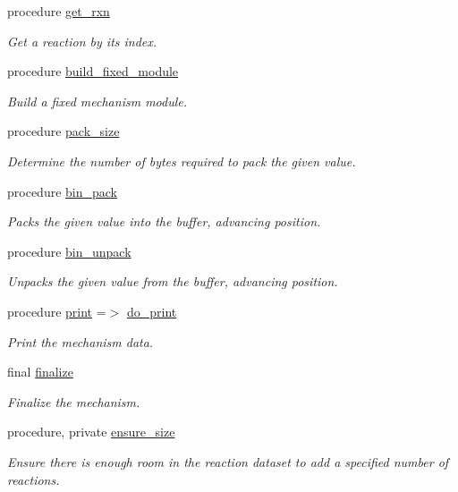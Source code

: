 \begin{DoxyCompactItemize}
procedure \mbox{\hyperlink{structpmc__mechanism__data_1_1mechanism__data__t_a3081f703c90ce4c40eba462587e8df49}{get\+\_\+rxn}}
\begin{DoxyCompactList}\small\item\em Get a reaction by its index. \end{DoxyCompactList}\item 
procedure \mbox{\hyperlink{structpmc__mechanism__data_1_1mechanism__data__t_a1c26d74d038b372e679d99382e638634}{build\+\_\+fixed\+\_\+module}}
\begin{DoxyCompactList}\small\item\em Build a fixed mechanism module. \end{DoxyCompactList}\item 
procedure \mbox{\hyperlink{structpmc__mechanism__data_1_1mechanism__data__t_a7393e85521f0ef422928cee1f2a504cc}{pack\+\_\+size}}
\begin{DoxyCompactList}\small\item\em Determine the number of bytes required to pack the given value. \end{DoxyCompactList}\item 
procedure \mbox{\hyperlink{structpmc__mechanism__data_1_1mechanism__data__t_a383287cafc8b57495c481f97ac577d80}{bin\+\_\+pack}}
\begin{DoxyCompactList}\small\item\em Packs the given value into the buffer, advancing position. \end{DoxyCompactList}\item 
procedure \mbox{\hyperlink{structpmc__mechanism__data_1_1mechanism__data__t_a85691b1893fe9c2f2ad58c1747af328a}{bin\+\_\+unpack}}
\begin{DoxyCompactList}\small\item\em Unpacks the given value from the buffer, advancing position. \end{DoxyCompactList}\item 
procedure \mbox{\hyperlink{structpmc__mechanism__data_1_1mechanism__data__t_abee10acc3f41c9109ddf72e8ee9ec8e6}{print}} =$>$ \mbox{\hyperlink{namespacepmc__mechanism__data_a6a010f3dccb9fb0ac7682f5a1bef3d12}{do\+\_\+print}}
\begin{DoxyCompactList}\small\item\em Print the mechanism data. \end{DoxyCompactList}\item 
final \mbox{\hyperlink{structpmc__mechanism__data_1_1mechanism__data__t_a24764a5da7a07cd331fa0f7e8fa521d8}{finalize}}
\begin{DoxyCompactList}\small\item\em Finalize the mechanism. \end{DoxyCompactList}\item 
procedure, private \mbox{\hyperlink{structpmc__mechanism__data_1_1mechanism__data__t_af637da1f2811f6100588a49c55fbc951}{ensure\+\_\+size}}
\begin{DoxyCompactList}\small\item\em Ensure there is enough room in the reaction dataset to add a specified number of reactions. \end{DoxyCompactList}\end{DoxyCompactItemize}

